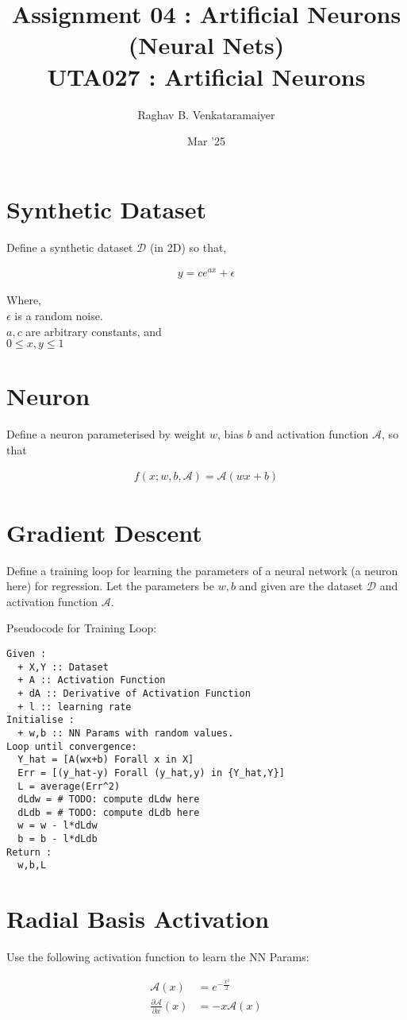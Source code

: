 \documentclass[11pt]{article}
\author{Raghav B. Venkataramaiyer}
\date{Mar '25}
\title{Assignment 04 : Artificial Neurons (Neural Nets)\\\medskip
\large UTA027 : Artificial Neurons}
\begin{document}
\maketitle

\section{Synthetic Dataset}
\label{sec:orgb84b1c5}

Define a synthetic dataset \(\mathcal{D}\) (in 2D) so
that,

\begin{align*}
  y = ce^{ax} + \epsilon
\end{align*}

Where, \\[0pt]
\(\epsilon\) is a random noise. \\[0pt]
\(a,c\) are arbitrary constants, and \\[0pt]
\(0 \leqslant x,y \leqslant 1\)

\section{Neuron}
\label{sec:org0878cf6}

Define a neuron parameterised by weight \(w\), bias \(b\)
and activation function \(\mathcal{A}\), so that

\begin{align*}
  f(x;w,b,\mathcal{A}) = \mathcal{A}(wx+b)
\end{align*}

\section{Gradient Descent}
\label{sec:orgeb2fce5}

Define a training loop for learning the parameters of a
neural network (a neuron here) for regression.  Let the
parameters be \(w,b\) and given are the dataset
\(\mathcal{D}\) and activation function \(\mathcal{A}\).

Pseudocode for Training Loop:

\begin{verbatim}
Given :
  + X,Y :: Dataset
  + A :: Activation Function
  + dA :: Derivative of Activation Function
  + l :: learning rate
Initialise :
  + w,b :: NN Params with random values.
Loop until convergence:
  Y_hat = [A(wx+b) Forall x in X]
  Err = [(y_hat-y) Forall (y_hat,y) in {Y_hat,Y}]
  L = average(Err^2)
  dLdw = # TODO: compute dLdw here
  dLdb = # TODO: compute dLdb here
  w = w - l*dLdw
  b = b - l*dLdb
Return :
  w,b,L
\end{verbatim}

\section{Radial Basis Activation}
\label{sec:org7c506a7}

Use the following activation function to learn the NN
Params:

\begin{align*}
  \mathcal{A}(x) &= e^{-\frac{x^2}{2}} \\
  \frac{\partial\mathcal{A}}{\partial x}(x)
  &= -x\mathcal{A}(x)
\end{align*}
\end{document}
